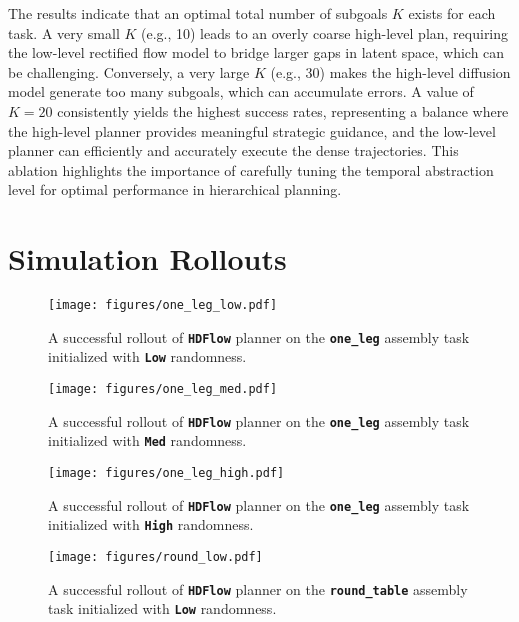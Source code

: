 \documentclass{article} %
\begin{document}
The results indicate that an optimal total number of subgoals \(K\) exists for each task. A very small \(K\) (e.g., 10) leads to an overly coarse high-level plan, requiring the low-level rectified flow model to bridge larger gaps in latent space, which can be challenging. Conversely, a very large \(K\) (e.g., 30) makes the high-level diffusion model generate too many subgoals, which can accumulate errors. A value of \(K=20\) consistently yields the highest success rates, representing a balance where the high-level planner provides meaningful strategic guidance, and the low-level planner can efficiently and accurately execute the dense trajectories. This ablation highlights the importance of carefully tuning the temporal abstraction level for optimal performance in hierarchical planning.


\newpage
\section{Simulation Rollouts}
\label{app:results}
\begin{figure}[htp]
    \centering
    \texttt{[image: figures/one\_leg\_low.pdf]}
    \caption{\small A successful rollout of \texttt{\textbf{HDFlow}} planner on the \texttt{\textbf{one\_leg}} assembly task initialized with \texttt{\textbf{Low}} randomness.}
    \label{fig:one_leg_low_rollout}
\end{figure}

\begin{figure}[htp]
    \centering
    \texttt{[image: figures/one\_leg\_med.pdf]}
    \caption{A successful rollout of \texttt{\textbf{HDFlow}} planner on the \texttt{\textbf{one\_leg}} assembly task initialized with \texttt{\textbf{Med}} randomness.}
    \label{fig:one_leg_med_rollout}
\end{figure}

\begin{figure}[htp]
    \centering
    \texttt{[image: figures/one\_leg\_high.pdf]}
    \caption{A successful rollout of \texttt{\textbf{HDFlow}} planner on the \texttt{\textbf{one\_leg}} assembly task initialized with \texttt{\textbf{High}} randomness.}
    \label{fig:one_leg_high_rollout}
\end{figure}

\begin{figure}[htp]
    \centering
    \texttt{[image: figures/round\_low.pdf]}
    \caption{A successful rollout of \texttt{\textbf{HDFlow}} planner on the \texttt{\textbf{round\_table}} assembly task initialized with \texttt{\textbf{Low}} randomness.}
    \label{fig:round_low_rollout}
\end{figure}
\end{document}
